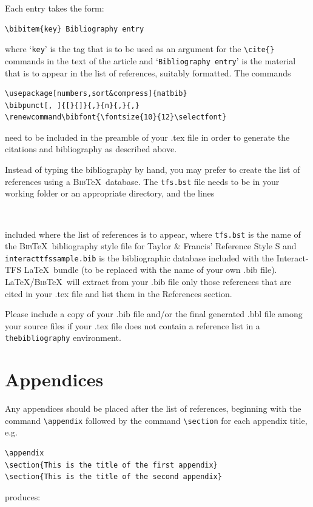 \documentclass[]{interact}
\renewcommand\bibfont{\fontsize{10}{12}\selectfont}%
\theoremstyle{plain}%
\theoremstyle{definition}
\theoremstyle{remark}
\begin{document}
\bigskip
\noindent Each entry takes the form:
\begin{verbatim}
\bibitem{key} Bibliography entry
\end{verbatim}
where `\texttt{key}' is the tag that is to be used as an argument for the \verb"\cite{}" commands in the text of the article and `\texttt{Bibliography entry}' is the material that is to appear in the list of references, suitably formatted. The commands
\begin{verbatim}
\usepackage[numbers,sort&compress]{natbib}
\bibpunct[, ]{[}{]}{,}{n}{,}{,}
\renewcommand\bibfont{\fontsize{10}{12}\selectfont}
\end{verbatim}
need to be included in the preamble of your .tex file in order to generate the citations and bibliography as described above.

Instead of typing the bibliography by hand, you may prefer to create the list of references using a \textsc{Bib}\TeX\ database. The \texttt{tfs.bst} file needs to be in your working folder or an appropriate directory, and the lines
\begin{verbatim}


\end{verbatim}
included where the list of references is to appear, where \texttt{tfs.bst} is the name of the \textsc{Bib}\TeX\ bibliography style file for Taylor \& Francis' Reference Style S and \texttt{interacttfssample.bib} is the bibliographic database included with the \textsf{Interact}-TFS \LaTeX\ bundle (to be replaced with the name of your own .bib file). \LaTeX/\textsc{Bib}\TeX\ will extract from your .bib file only those references that are cited in your .tex file and list them in the References section.

Please include a copy of your .bib file and/or the final generated .bbl file among your source files if your .tex file does not contain a reference list in a \texttt{thebibliography} environment.


\section{Appendices}

Any appendices should be placed after the list of references, beginning with the command \verb"\appendix" followed by the command \verb"\section" for each appendix title, e.g.
\begin{verbatim}
\appendix
\section{This is the title of the first appendix}
\section{This is the title of the second appendix}
\end{verbatim}
produces:\medskip
\end{document}
